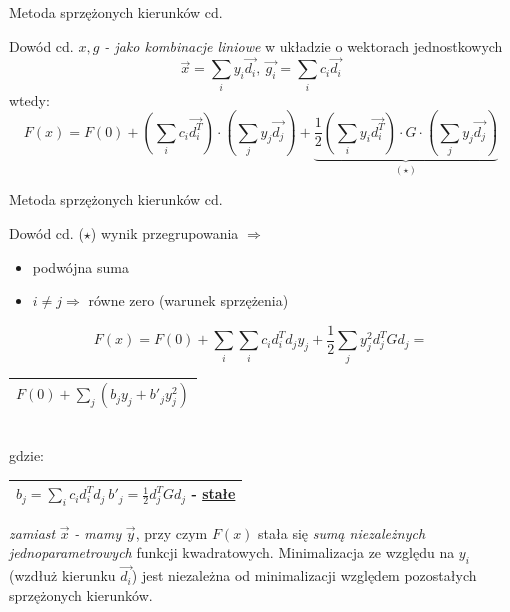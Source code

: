   \begin{frame}{Metoda sprzężonych kierunków cd.}

 	\begin{block}{Dowód cd.}
		\emph{$x, g$ -  jako kombinacje liniowe} w układzie o wektorach jednostkowych
		\begin{displaymath}
			\vec{x} = \sum_i y_i \vec{d_i}, \ \vec{g_i} = \sum_i c_i \vec{d_i}
		\end{displaymath}
		wtedy:
		\begin{displaymath}
			F(x) = F(0) + (\sum_i c_i \vec{d_i^T}) \cdot (\sum_j y_j \vec{d_j}) +
			\underbrace{\frac{1}{2} (\sum_i y_i \vec{d_i^T}) \cdot G \cdot (\sum_j y_j \vec{d_j})}_{(\star)}
		\end{displaymath}
 	\end{block}

  \end{frame}

  \begin{frame}{Metoda sprzężonych kierunków cd.}

 	\begin{block}{Dowód cd.}
 		($\star$) wynik przegrupowania $\Rightarrow$
		\begin{itemize}
			\item podwójna suma
			\item $i \neq j \Rightarrow$ równe zero (warunek sprzężenia)
		\end{itemize}
		\begin{displaymath}
			F(x) = F(0) + \sum_i \sum_i c_i d_i^T d_j y_j + \frac{1}{2} \sum_j y_j^2 d_j^T G d_j =
		\end{displaymath}
		\begin{center}
		   	\begin{tabular}{|c|}
		   	\hline
				$F(0) + \sum_j (b_j y_j + b'_j y_j^2)$
			\\ \hline
			\end{tabular}
			\smallskip
			\\gdzie:
			\begin{tabular}{|c|}
		   	\hline
				$b_j = \sum_i c_i d_i^T d_j  \  b'_j = \frac{1}{2} d_j^T G d_j$ - \underline{stałe}
			\\ \hline
			\end{tabular}
		\end{center}
		\emph{zamiast} $\vec{x}$ \emph{- mamy} $\vec{y}$, przy czym $F(x)$ stała się \emph{sumą niezależnych jednoparametrowych} funkcji kwadratowych. Minimalizacja ze względu na $y_i$ (wzdłuż kierunku $\vec{d_i}$) jest niezależna od minimalizacji  względem pozostałych sprzężonych kierunków.
 	\end{block}

  \end{frame}

